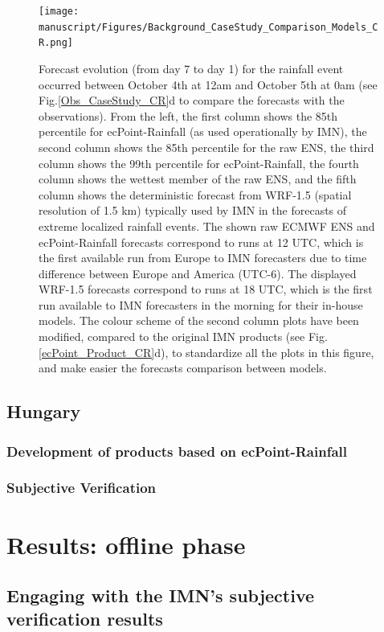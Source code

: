 \documentclass[twocol]{ametsocV5} %
\begin{document}
\begin{figure}
\centerline{\texttt{[image: manuscript/Figures/Background\_CaseStudy\_Comparison\_Models\_CR.png]}}
\caption{Forecast evolution (from day 7 to day 1) for the rainfall event occurred between October 4th at 12am and October 5th at 0am (see Fig.\ref{Obs_CaseStudy_CR}d to compare the forecasts with the observations). From the left, the first column shows the 85th percentile for ecPoint-Rainfall (as used operationally by IMN), the second column shows the 85th percentile for the raw ENS, the third column shows the 99th percentile for ecPoint-Rainfall, the fourth column shows the wettest member of the raw ENS, and the fifth column shows the deterministic forecast from WRF-1.5 (spatial resolution of 1.5 km) typically used by IMN in the forecasts of extreme localized rainfall events. The shown raw ECMWF ENS and ecPoint-Rainfall forecasts correspond to runs at 12 UTC, which is the first available run from Europe to IMN forecasters due to time difference between Europe and America (UTC-6). The displayed WRF-1.5 forecasts correspond to runs at 18 UTC, which is the first run available to IMN forecasters in the morning for their in-house models. The colour scheme of the second column plots have been modified, compared to the original IMN products (see Fig.\ref{ecPoint_Product_CR}d), to standardize all the plots in this figure, and make easier the forecasts comparison between models.}
\label{Background_CaseStudy_Comparison_Models_CR}
\end{figure}


\subsection{Hungary}
\subsubsection{Development of products based on ecPoint-Rainfall}
\subsubsection{Subjective Verification}


\section{Results: offline phase}

\subsection{Engaging with the IMN's subjective verification results}
\end{document}
